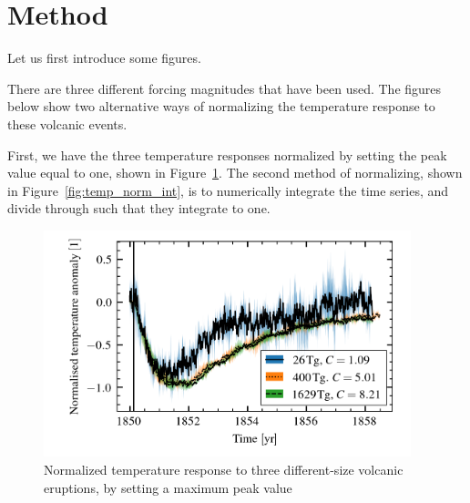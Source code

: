 \documentclass{ametsocV5}
\begin{document}

\section{Method}

Let us first introduce some figures.

There are three different forcing magnitudes that have been used. The figures below
show two alternative ways of normalizing the temperature response to these volcanic
events.

First, we have the three temperature responses normalized by setting the peak value
equal to one, shown in Figure~\ref{fig:temp_norm_max}. The second method of
normalizing, shown in Figure~\ref{fig:temp_norm_int}, is to numerically integrate the
time series, and divide through such that they integrate to one.

\begin{figure}
  \begin{center}
    \includegraphics[width=0.95\textwidth]{figures/compare-waveform-max.png}
  \end{center}
  \caption{Normalized temperature response to three different-size volcanic eruptions,
    by setting a maximum peak value}
  \label{fig:temp_norm_max}
\end{figure}
\end{document}
